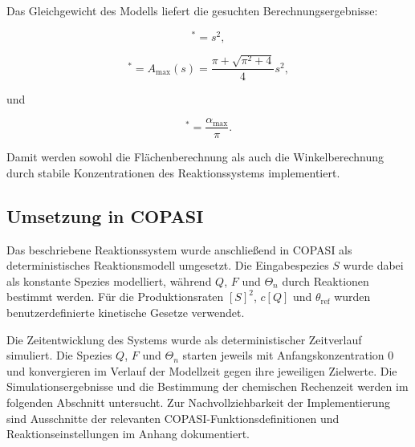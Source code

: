 Das Gleichgewicht des Modells liefert die gesuchten Berechnungsergebnisse:

\begin{equation}
    [Q]^*=s^2,
\end{equation}

\begin{equation}
    [F]^*
    =
    A_{\max}(s)
    =
    \frac{\pi+\sqrt{\pi^2+4}}{4}s^2,
\end{equation}

und

\begin{equation}
    [\Theta_n]^*
    =
    \frac{\alpha_{\max}}{\pi}.
\end{equation}

Damit werden sowohl die Flächenberechnung als auch die Winkelberechnung
durch stabile Konzentrationen des Reaktionssystems implementiert.

\subsection{Umsetzung in COPASI}

Das beschriebene Reaktionssystem wurde anschließend in COPASI als
deterministisches Reaktionsmodell umgesetzt. Die Eingabespezies \(S\)
wurde dabei als konstante Spezies modelliert, während \(Q\), \(F\) und
\(\Theta_n\) durch Reaktionen bestimmt werden. Für die Produktionsraten
\([S]^2\), \(c[Q]\) und \(\theta_{\mathrm{ref}}\) wurden
benutzerdefinierte kinetische Gesetze verwendet.

Die Zeitentwicklung des Systems wurde als deterministischer Zeitverlauf
simuliert. Die Spezies \(Q\), \(F\) und \(\Theta_n\) starten jeweils mit
Anfangskonzentration \(0\) und konvergieren im Verlauf der Modellzeit gegen
ihre jeweiligen Zielwerte. Die Simulationsergebnisse und die Bestimmung
der chemischen Rechenzeit werden im folgenden Abschnitt untersucht. Zur Nachvollziehbarkeit der Implementierung sind Ausschnitte der relevanten
COPASI-Funktionsdefinitionen und Reaktionseinstellungen im Anhang
dokumentiert. 

